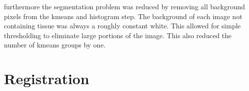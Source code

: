 \documentclass[a4paper,10pt,oneside]{article}
\begin{document}
furthermore the segmentation problem was reduced by removing all background pixels from the kmeans and histogram step. The background of each image not containing tissue was always a roughly constant white. This allowed for simple thresholding to eliminate large portions of the image. This also reduced the number of kmeans groups by one.

\section{Registration}
\end{document}
